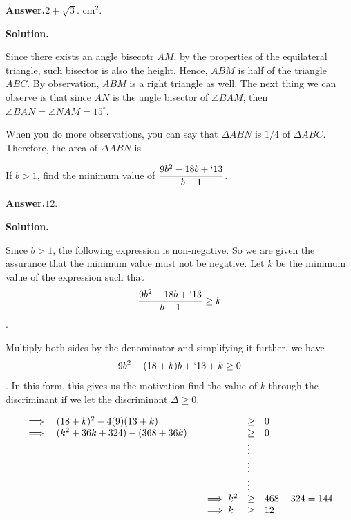 \documentclass[12pt,paper=letter]{scrartcl}
\newcommand{\ans}[1]{{\sffamily \bfseries Answer.}\;\(\boxed{\text{#1}}\).}
\newcommand{\sol}{{\sffamily \bfseries Solution.}\;}
\begin{document}
\ans{$2 + \sqrt{3}$. cm$^2$}

\sol

 Since there exists an angle bisecotr $AM$, by the properties of the equilateral triangle, such bisector is also the height. Hence, $ABM$ is half of the triangle $ABC.$ By observation, $ABM$ is a right triangle as well. The next thing we can observe is that since $AN$ is the angle bisector of $\angle BAM$, then $\angle BAN = \angle NAM = 15^{\circ}. $ 

\vspace{2mm}

When you do more observations, you can say that $\Delta ABN$ is $1/4$ of $\Delta ABC$. Therefore, the area of $\Delta ABN$ is 


\begin{probboxed} If $b>1$, find the minimum value of $\dfrac{9b^2 -18b +`13}{b-1}$.


\end{probboxed}

\ans{12}

\sol

Since $b>1$, the following expression is non-negative. So we are given the assurance that the minimum value must not be negative. Let $k$ be the minimum value of the expression such that $$\dfrac{9b^2 -18b +`13}{b-1} \geq k$$.

Multiply both sides by the denominator and simplifying it further, we have $$9b^2 -(18+k)b +`13+k \geq 0$$. In this form, this gives us the motivation  find the value of $k$ through the discriminant if we let the discriminant $\Delta \geq 0$.

\vspace{-3em}

\begin{center}
    \begin{equation*}
        \begin{array}{llll}
            \implies & (18+k)^2 -4(9)(13+k) & \geq & 0 \\
            \implies & (k^2 +36k+324)-(368 +36k) & \geq & 0 \\
            &&\vdots& \\
            &&\vdots& \\
            &&\vdots& \\
            & \hspace{54mm} \implies k^2 & \geq & 468-324=144  \\
              & \hspace{54mm} \implies k & \geq & 12  \\
        \end{array}
    \end{equation*}
\end{center}
\end{document}
